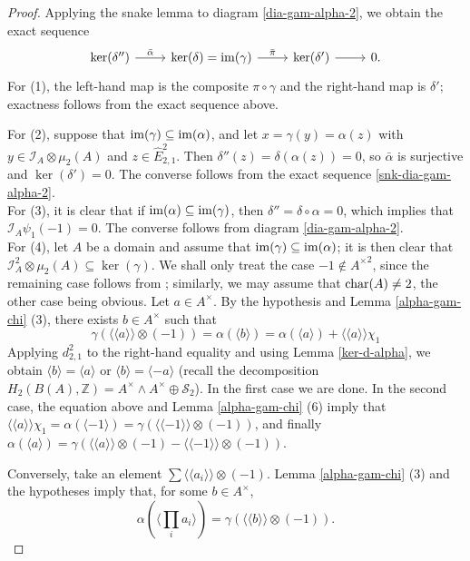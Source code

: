 \documentclass[11pt]{amsart}
\theoremstyle{definition}
\theoremstyle{plain}
\numberwithin{equation}{section}
\newcommand{\z}{\mathbb{Z}}
\newcommand{\II}{\mathcal{I}}
\renewcommand{\SS}{\mathcal{S}}
\renewcommand{\aa}{{A^\times}}
\newcommand{\lan}{\langle}
\newcommand{\ran}{\rangle}
\newcommand{\Lan}{\langle \! \langle}
\newcommand{\Ran}{\rangle \! \rangle}
\newcommand{\im}{{\rm im}}
\renewcommand{\char}{{\rm char}}
\begin{document}
\begin{proof}
    Applying the snake lemma to diagram \eqref{dia-gam-alpha-2}, we obtain the exact sequence
    \begin{equation}\label{snk-dia-gam-alpha-2}
    \begin{tikzcd}
        \ker(\delta'')\ar[r,"\bar{\alpha}"] & \ker(\delta)=\im(\gamma)\ar[r,"\bar{\pi}"] & \ker(\delta') \ar[r] & 0.
    \end{tikzcd}
    \end{equation}
    For (1), the left-hand map is the composite $\pi\circ\gamma$ and the right-hand map is $\delta'$; exactness follows from the exact sequence above.
    
    For (2), suppose that $\im(\gamma)\subseteq\im(\alpha)$, and let $x=\gamma(y)=\alpha(z)$ with $y\in\II_A\otimes\mu_2(A)$ and $z\in\hat{E}^2_{2,1}$. Then $\delta''(z)=\delta(\alpha(z))=0$, so $\bar{\alpha}$ is surjective and $\ker(\delta')=0$. The converse follows from the exact sequence \eqref{snk-dia-gam-alpha-2}.
    \\
    For (3), it is clear that if $\im(\alpha)\subseteq\im(\gamma)$, then $\delta''=\delta\circ\alpha=0$, which implies that $\II_A\psi_1(-1)=0$. The converse follows from diagram \eqref{dia-gam-alpha-2}.
    \\
    For (4), let $A$ be a domain and assume that $\im(\gamma)\subseteq\im(\alpha)$; it is then clear that $\II_A^2\otimes\mu_2(A)\subseteq \ker(\gamma)$. We shall only treat the case $-1\notin\aa^2$, since the remaining case follows from \cite[Corollary 6.4]{B-E--2023}; similarly, we may assume that $\char(A)\neq 2$, the other case being obvious. Let $a\in\aa$. By the hypothesis and Lemma \ref{alpha-gam-chi} (3), there exists $b\in\aa$ such that 
    \[
        \gamma(\Lan a\Ran\otimes(-1))=\alpha(\lan b\ran)=\alpha(\lan a\ran)+\Lan a\Ran\chi_1
    \]
    Applying $d^2_{2,1}$ to the right-hand equality and using Lemma \ref{ker-d-alpha}, we obtain $\lan b\ran=\lan a\ran$ or $\lan b\ran=\lan -a\ran$ (recall the decomposition $H_2(B(A),\z)=\aa\wedge\aa\oplus \SS_2$). In the first case we are done. In the second case, the equation above and Lemma \ref{alpha-gam-chi} (6) imply that $\Lan a\Ran\chi_1=\alpha(\lan -1\ran)=\gamma(\Lan -1\Ran\otimes(-1))$, and finally $\alpha(\lan a\ran)=\gamma(\Lan a\Ran\otimes(-1)-\Lan -1\Ran\otimes (-1))$. 
    
    Conversely, take an element $\sum\Lan a_i\Ran\otimes(-1)$. Lemma \ref{alpha-gam-chi} (3) and the hypotheses imply that, for some $b\in\aa$,
    \begin{equation}
        \label{eq-prf4}
        \alpha(\lan\prod_{i}a_i\ran)=\gamma(\Lan b\Ran\otimes(-1)).
    \end{equation}
    

\end{proof}
\end{document}
